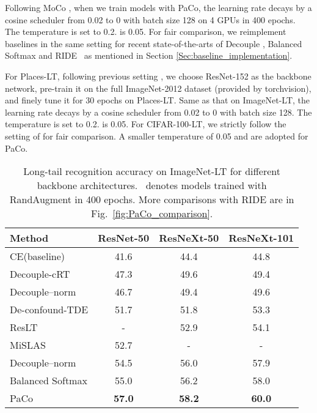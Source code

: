 \documentclass[10pt,twocolumn,letterpaper]{article}
\begin{document}
Following MoCo \cite{DBLP:conf/cvpr/He0WXG20, DBLP:journals/corr/abs-2003-04297}, when we train models with PaCo, the learning rate decays by a cosine scheduler from 0.02 to 0 with batch size 128 on 4 GPUs in 400 epochs. The temperature is set to 0.2.  is 0.05.
For fair comparison, we reimplement baselines in the same setting for recent state-of-the-arts of Decouple \cite{DBLP:conf/iclr/KangXRYGFK20}, Balanced Softmax \cite{DBLP:conf/nips/RenYSMZYL20} and RIDE~\cite{DBLP:journals/corr/abs-2010-01809} as mentioned in Section \ref{Sec:baseline_implementation}.

For Places-LT, following previous setting \cite{Liu_2019_CVPR, DBLP:journals/corr/abs-2101-10633},
we choose ResNet-152 as the backbone network, pre-train it on the full ImageNet-2012 dataset (provided by torchvision), and finely tune it for 30 epochs on Places-LT. Same as that on ImageNet-LT, the learning rate decays by a cosine scheduler from 0.02 to 0 with batch size 128. The temperature is set to 0.2.  is 0.05. For CIFAR-100-LT, we strictly follow the setting of \cite{DBLP:conf/nips/RenYSMZYL20} for fair comparison. A smaller temperature of 0.05 and  are adopted for PaCo.


\begin{table}[t]
	\centering
	\caption{Long-tail recognition accuracy on ImageNet-LT for different backbone architectures.  \dag~denotes models trained with RandAugment \cite{DBLP:conf/nips/CubukZS020} in 400 epochs. More comparisons with RIDE \cite{DBLP:journals/corr/abs-2010-01809} are in Fig.~\ref{fig:PaCo_comparison}.}\small
	\label{tab:imagenet_main}
	{
		\begin{tabular}{lc@{\ \ }c@{\ \ }c} 
			\toprule
			Method & ResNet-50 & ResNeXt-50 & ResNeXt-101 \\\midrule
			CE(baseline)                &41.6 &44.4 &44.8 \\
			Decouple-cRT                &47.3 &49.6 &49.4 \\
			Decouple--norm        &46.7 &49.4 &49.6 \\
			De-confound-TDE    &51.7 &51.8 &53.3 \\
			ResLT              &-    &52.9 &54.1 \\
			MiSLAS             &52.7 &-    & -   \\
			\midrule
			Decouple--norm \dag     &54.5 &56.0 &57.9 \\
			Balanced Softmax \dag         &55.0 &56.2 &58.0 \\
			PaCo\dag                      &\textbf{57.0} &\textbf{58.2} &\textbf{60.0} \\
			\bottomrule
		\end{tabular}
	}
	
\end{table}
\end{document}
